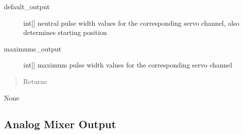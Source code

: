 \documentclass[letterpaper,10pt,english]{sphinxmanual}
\begin{document}
\begin{fulllineitems}
\begin{fulllineitems}
\begin{description}
\item[{default\_output}] \leavevmode{[}{[}int{]}{]}
\sphinxAtStartPar
neutral pulse width values for the corresponding servo channel, also determines starting position

\item[{maximums\_output}] \leavevmode{[}{[}int{]}{]}
\sphinxAtStartPar
maximum pulse width values for the corresponding servo channel

\end{description}
\begin{quote}\begin{description}
\item[{Returns}] \leavevmode
\end{description}\end{quote}

\sphinxAtStartPar
None

\end{fulllineitems}


\end{fulllineitems}



\subsection{Analog Mixer Output}
\label{\detokenize{generic:module-AnalogMixerOutput}}\label{\detokenize{generic:analog-mixer-output}}
\end{document}
